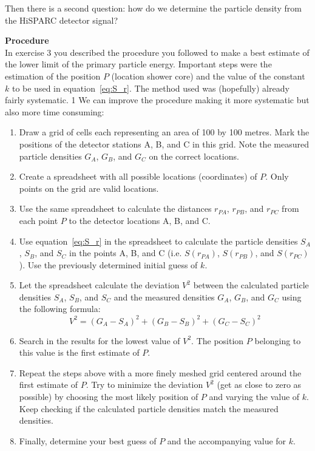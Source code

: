 \documentclass[12pt,a4paper]{article}
\numberwithin{equation}{section}
\numberwithin{figure}{section}
\numberwithin{table}{section}
\begin{document}
Then there is a second question: how do we determine the particle density from the HiSPARC detector signal? 

\begin{shaded}
\noindent \textbf{Procedure}
\\ \indent In exercise 3 you described the procedure you followed to make a best estimate of the lower limit of the primary particle energy. Important steps were the estimation of the position $P$ (location shower core) and the value of the constant $k$ to be used in equation~\ref{eq:S_r}. The method used was (hopefully) already fairly systematic.
1
We can improve the procedure making it more systematic but also more time consuming:
\begin{enumerate}[-]
\item Draw a grid of cells each representing an area of 100 by 100 metres. Mark the positions of the detector stations A, B, and C in this grid. Note the measured particle densities $G_A$, $G_B$, and $G_C$ on the correct locations.
\item Create a spreadsheet with all possible locations (coordinates) of $P$. Only points on the grid are valid locations.
\item Use the same spreadsheet to calculate the distances $r_{PA}$, $r_{PB}$, and $r_{PC}$ from each point $P$ to the detector locations A, B, and C. 
\item Use equation~\ref{eq:S_r} in the spreadsheet to calculate the particle densities $S_A$, $S_B$, and $S_C$ in the points A, B, and C (i.e. $S(r_{PA})$, $S(r_{PB})$, and $S(r_{PC})$). Use the previously determined initial guess of $k$.
\item Let the spreadsheet calculate the deviation $V^2$ between the calculated particle densities $S_A$, $S_B$, and $S_C$ and the measured densities $G_A$, $G_B$, and $G_C$ using the following formula:
\begin{equation}
V^2 = \left( G_A - S_A \right)^2 + \left( G_B - S_B \right)^2 + \left( G_C - S_C \right)^2
\end{equation}
\item Search in the results for the lowest value of $V^2$. The position $P$ belonging to this value is the first estimate of $P$.
\item Repeat the steps above with a more finely meshed grid centered around the first estimate of $P$. Try to minimize the deviation $V^2$ (get as close to zero as possible) by choosing the most likely position of $P$ and varying the value of $k$. Keep checking if the calculated particle densities match the measured densities.
\item Finally, determine your best guess of $P$ and the accompanying value for $k$.
\end{enumerate}
\end{shaded} 
\end{document}
